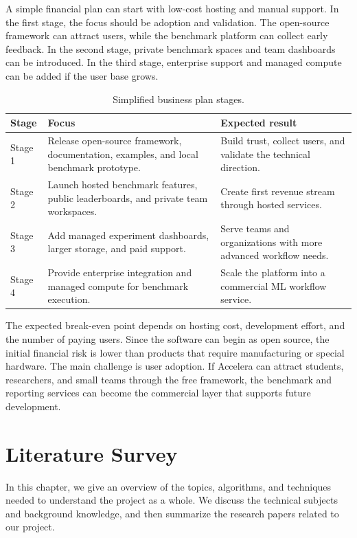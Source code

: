 \documentclass[12pt,a4paper]{report}
\begin{document}
A simple financial plan can start with low-cost hosting and manual support. In
the first stage, the focus should be adoption and validation. The open-source
framework can attract users, while the benchmark platform can collect early
feedback. In the second stage, private benchmark spaces and team dashboards can
be introduced. In the third stage, enterprise support and managed compute can be
added if the user base grows.

\begin{table}[!htbp]
\centering
\caption{Simplified business plan stages.}
\label{tab:business-plan-stages}
\small
\renewcommand{\arraystretch}{1.15}
\setlength{\tabcolsep}{4pt}
\begin{tabular}{p{}p{}p{}}
\toprule
Stage & Focus & Expected result \\
\midrule
Stage 1 &
Release open-source framework, documentation, examples, and local benchmark
prototype. &
Build trust, collect users, and validate the technical direction. \\

Stage 2 &
Launch hosted benchmark features, public leaderboards, and private team
workspaces. &
Create first revenue stream through hosted services. \\

Stage 3 &
Add managed experiment dashboards, larger storage, and paid support. &
Serve teams and organizations with more advanced workflow needs. \\

Stage 4 &
Provide enterprise integration and managed compute for benchmark execution. &
Scale the platform into a commercial ML workflow service. \\
\bottomrule
\end{tabular}
\renewcommand{\arraystretch}{1.0}
\end{table}

The expected break-even point depends on hosting cost, development effort, and
the number of paying users. Since the software can begin as open source, the
initial financial risk is lower than products that require manufacturing or
special hardware. The main challenge is user adoption. If Accelera can attract
students, researchers, and small teams through the free framework, the benchmark
and reporting services can become the commercial layer that supports future
development.


\chapter{Literature Survey}
In this chapter, we give an overview of the topics, algorithms, and techniques needed to understand the project as a whole. We discuss the technical subjects and background knowledge, and then summarize the research papers related to our project.
\end{document}
